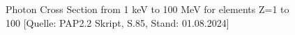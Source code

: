 \documentclass{article}
\newcommand\invisiblesection[1]{%
  \refstepcounter{section}%
  \addcontentsline{toc}{section}{\protect\numberline{\thesection}#1}%
  \sectionmark{#1}\phantom{}}
\begin{document}
\begin{figure}[!p]
    \centering
    \caption{Photon Cross Section from 1 keV to 100 MeV for elements Z=1 to 100 [Quelle: PAP2.2 Skript, S.85, Stand: 01.08.2024]}
    \label{fig:Anhang-PhotonCrossSection}
\end{figure}

\newpage


\end{document}
